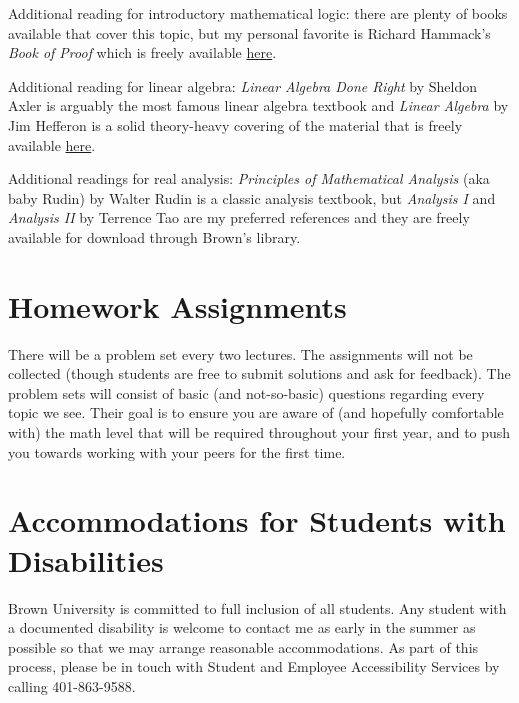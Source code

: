 \documentclass[11pt]{article}
\begin{document}
Additional reading for introductory mathematical logic: there are plenty of books available that cover this topic, but my personal favorite is Richard Hammack's \textit{Book of Proof} which is freely available \href{https://richardhammack.github.io/BookOfProof/}{here}.

Additional reading for linear algebra: \textit{Linear Algebra Done Right} by Sheldon Axler is arguably the most famous linear algebra textbook and \textit{Linear Algebra} by Jim Hefferon is a solid theory-heavy covering of the material that is freely available \href{https://hefferon.net/linearalgebra/}{here}. 

Additional readings for real analysis: \textit{Principles of Mathematical Analysis} (aka baby Rudin) by Walter Rudin is a classic analysis textbook, but \textit{Analysis I} and \textit{Analysis II} by Terrence Tao are my preferred references and they are freely available for download through Brown's library. 

\section{Homework Assignments}
\label{sec:homework_assignments}

There will be a problem set every two lectures. The assignments will not be collected (though students are free to submit solutions and ask for feedback). The problem sets will consist of basic (and not-so-basic) questions regarding every topic we see. Their goal is to ensure you are aware of (and hopefully comfortable with) the math level that will be required throughout your first year, and to push you towards working with your peers for the first time.

\section{Accommodations for Students with Disabilities}
\label{sec:accommodations_for_students_with_disabilities}

Brown University is committed to full inclusion of all students. Any student with a documented disability is welcome to contact me as early in the summer as possible so that we may arrange reasonable accommodations. As part of this process, please be in touch with Student and Employee Accessibility Services by calling 401-863-9588.
\end{document}
